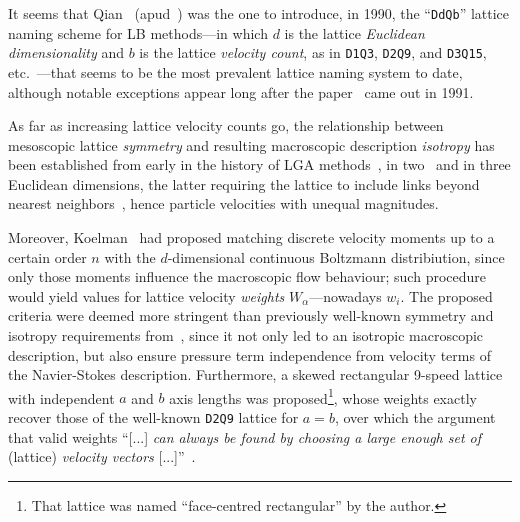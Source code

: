     It seems that Qian~\cite{1990-QianYH-Paris} (apud~\cite[p.~235]{1993-QianYH-JSciComput}) was the one to introduce, in  1990,
    the ``\texttt{DdQb}'' lattice naming scheme for LB methods---in which $d$ is the lattice \emph{Euclidean dimensionality} and
    $b$   is   the   lattice   \emph{velocity   count},   as    in    \texttt{D1Q3},    \texttt{D2Q9},    and    \texttt{D3Q15},
    etc.~\cite{1992-QianYH+LallemandP-EurophysLett}---that seems to be  the  most  prevalent  lattice  naming  system  to  date,
    although notable exceptions appear long after the paper~\cite{1991-QianYH+LallemandP-AdvKinTheoContMech} came out in 1991.

    As far as increasing lattice velocity counts go, the relationship between mesoscopic lattice \emph{symmetry}  and  resulting
    macroscopic   description   \emph{isotropy}   has   been   established    from    early    in    the    history    of    LGA
    methods~\cite{1973-HardyJ+PazzisO-JMathPhys, 1976-HardyJ+PomeauY-PhysRevA},  in  two~\cite{1986-FrischU+PomeauY-PhysRevLett}
    and  in  three  Euclidean   dimensions,   the   latter   requiring   the   lattice   to   include   links   beyond   nearest
    neighbors~\cite[pp.~473,490]{1986-WolframS-JStatPhys}, hence particle velocities with unequal magnitudes.

    Moreover, Koelman~\cite{1991-KoelmanJMVA-EurophysLett} had proposed matching discrete velocity moments up to a certain order
    $n$ with the $d$-dimensional continuous Boltzmann distribiution, since only those moments  influence  the  macroscopic  flow
    behaviour; such procedure would yield values for lattice velocity \emph{weights} $W_{\alpha}$---nowadays $w_i$. The proposed
    criteria   were   deemed   more   stringent   than   previously    well-known    symmetry    and    isotropy    requirements
    from~\cite{1986-WolframS-JStatPhys}, since it not only led to an isotropic macroscopic description, but also ensure pressure
    term independence from velocity terms of the Navier-Stokes description. Furthermore, a skewed  rectangular  9-speed  lattice
    with independent $a$ and $b$ axis lengths was proposed\footnote{That lattice was named ``face-centred rectangular''  by  the
    author.}, whose weights exactly recover those of the well-known \texttt{D2Q9} lattice for $a = b$, over which  the  argument
    that valid weights ``[...] \emph{can always be found by choosing a large enough set of} (lattice) \emph{velocity  vectors\/}
    [...]''~\cite{1991-KoelmanJMVA-EurophysLett}.

